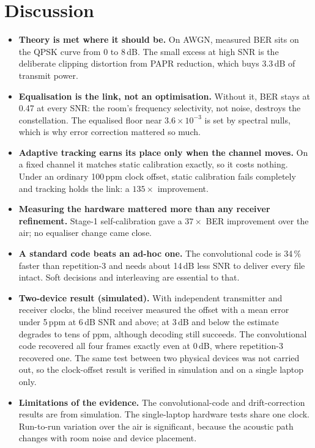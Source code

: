 \documentclass[11pt,a4paper]{report}
\begin{document}
\section{Discussion}
\begin{itemize}
    \item \textbf{Theory is met where it should be.} On AWGN, measured BER sits on the
    QPSK curve from 0 to 8\,dB. The small excess at high SNR is the deliberate clipping
    distortion from PAPR reduction, which buys 3.3\,dB of transmit power.
    \item \textbf{Equalisation is the link, not an optimisation.} Without it, BER stays
    at 0.47 at every SNR: the room's frequency selectivity, not noise, destroys the
    constellation. The equalised floor near $3.6\times10^{-3}$ is set by spectral nulls,
    which is why error correction mattered so much.
    \item \textbf{Adaptive tracking earns its place only when the channel moves.} On a
    fixed channel it matches static calibration exactly, so it costs nothing. Under an
    ordinary 100\,ppm clock offset, static calibration fails completely and tracking
    holds the link: a $135\times$ improvement.
    \item \textbf{Measuring the hardware mattered more than any receiver refinement.}
    Stage-1 self-calibration gave a $37\times$ BER improvement over the air; no
    equaliser change came close.
    \item \textbf{A standard code beats an ad-hoc one.} The convolutional code is 34\,\%
    faster than repetition-3 and needs about 14\,dB less SNR to deliver every file
    intact. Soft decisions and interleaving are essential to that.
    \item \textbf{Two-device result (simulated).} With independent transmitter and
    receiver clocks, the blind receiver measured the offset with a mean error under
    5\,ppm at 6\,dB SNR and above; at 3\,dB and below the estimate degrades to tens of
    ppm, although decoding still succeeds. The convolutional code recovered all four
    frames exactly even at 0\,dB, where repetition-3 recovered one. The same test between
    two physical devices was not carried out, so the clock-offset result is verified in
    simulation and on a single laptop only.
    \item \textbf{Limitations of the evidence.} The convolutional-code and drift-correction
    results are from simulation. The single-laptop hardware tests share one clock. Run-to-run
    variation over the air is significant, because the acoustic path changes with room
    noise and device placement.
\end{itemize}
\end{document}
